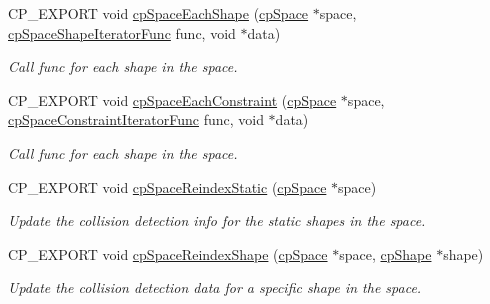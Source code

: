 \begin{DoxyCompactItemize}
\mbox{\label{group__cpSpace_gab586704d72681645d9e91d42e97f96ff}} 
C\+P\+\_\+\+E\+X\+P\+O\+RT void \hyperlink{group__cpSpace_gab586704d72681645d9e91d42e97f96ff}{cp\+Space\+Each\+Shape} (\hyperlink{structcpSpace}{cp\+Space} $\ast$space, \hyperlink{group__cpSpace_gafae017c9a8a7c082032035bf165e4ec9}{cp\+Space\+Shape\+Iterator\+Func} func, void $\ast$data)
\begin{DoxyCompactList}\small\item\em Call {\ttfamily func} for each shape in the space. \end{DoxyCompactList}\item 
\mbox{\label{group__cpSpace_ga0f494c054cb89a0a842ef1a0e344ce58}} 
C\+P\+\_\+\+E\+X\+P\+O\+RT void \hyperlink{group__cpSpace_ga0f494c054cb89a0a842ef1a0e344ce58}{cp\+Space\+Each\+Constraint} (\hyperlink{structcpSpace}{cp\+Space} $\ast$space, \hyperlink{group__cpSpace_ga0bf20ed2411342352dc43b71c60649c1}{cp\+Space\+Constraint\+Iterator\+Func} func, void $\ast$data)
\begin{DoxyCompactList}\small\item\em Call {\ttfamily func} for each shape in the space. \end{DoxyCompactList}\item 
\mbox{\label{group__cpSpace_ga714f105c977f9006128981fa30d8e7ec}} 
C\+P\+\_\+\+E\+X\+P\+O\+RT void \hyperlink{group__cpSpace_ga714f105c977f9006128981fa30d8e7ec}{cp\+Space\+Reindex\+Static} (\hyperlink{structcpSpace}{cp\+Space} $\ast$space)
\begin{DoxyCompactList}\small\item\em Update the collision detection info for the static shapes in the space. \end{DoxyCompactList}\item 
\mbox{\label{group__cpSpace_gab370e5ee7912ff798bebeb01fc0ba63b}} 
C\+P\+\_\+\+E\+X\+P\+O\+RT void \hyperlink{group__cpSpace_gab370e5ee7912ff798bebeb01fc0ba63b}{cp\+Space\+Reindex\+Shape} (\hyperlink{structcpSpace}{cp\+Space} $\ast$space, \hyperlink{structcpShape}{cp\+Shape} $\ast$shape)
\begin{DoxyCompactList}\small\item\em Update the collision detection data for a specific shape in the space. \end{DoxyCompactList}\item 

\end{DoxyCompactItemize}
